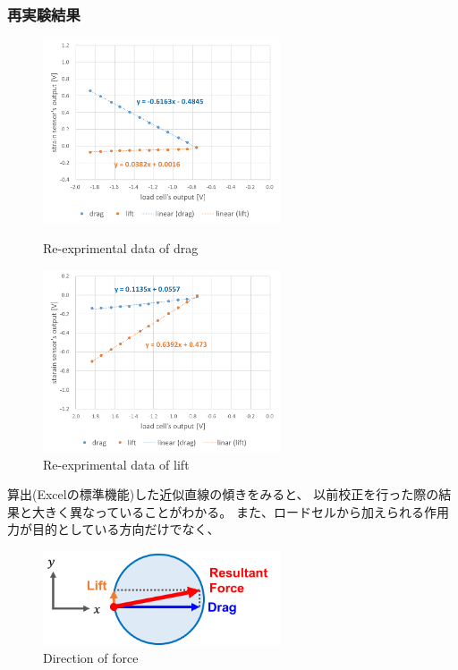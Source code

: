 \documentclass[twocolumn,a4j]{jsarticle}
\begin{document}
\subsubsection*{再実験結果}
\begin{figure}[htbp]
    \footnotesize
    \begin{center}
        \includegraphics[width=70mm]{../images/graph_21119_drag_1.png}
        \caption{Re-exprimental data of drag}
        \includegraphics[width=70mm]{../images/graph_21119_lift_1.png}
        \caption{Re-exprimental data of lift}
    \end{center}
\end{figure}

算出(Excelの標準機能)した近似直線の傾きをみると、
以前校正を行った際の結果と大きく異なっていることがわかる。
また、ロードセルから加えられる作用力が目的としている方向だけでなく、


\begin{figure}[htbp]
    \footnotesize
    \begin{center}
        \includegraphics[width=70mm]{../images/image_11.png}
        \caption{Direction of force}
    \end{center}
\end{figure}
\end{document}

